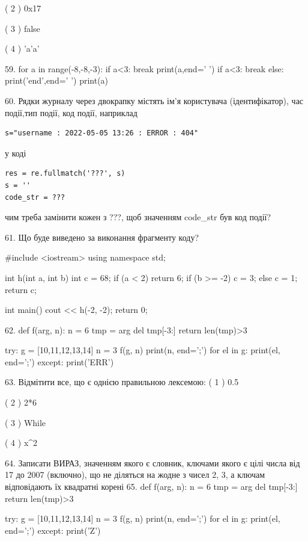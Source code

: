 \documentclass[11pt]{article}
\begin{document}
( 2 ) 0x17

( 3 ) false

( 4 ) 'a'a'

59. 
for a in range(-8,-8,-3):
    if a<3:
        break
        print(a,end=' ')
    if a<3:
        break
    else:
        print('end',end=' ')
    print(a)

60. 
Рядки журналу через двокрапку містять ім'я користувача (ідентифікатор), час події,тип події, код події, наприклад
\begin{verbatim}
s="username : 2022-05-05 13:26 : ERROR : 404"
\end{verbatim}
у коді 
\begin{verbatim}
res = re.fullmatch('???', s) 
s = ''
code_str = ??? 
\end{verbatim}
чим треба замінити кожен з ???, щоб значенням code\_str був код події? 



61. Що буде виведено за виконання фрагменту коду?

#include <iostream>
using namespace std;

int h(int a, int b){
    int c = 68;
    if (a < 2)
        return 6;
    if (b >= -2)
         c = 3;
    else 
        c = 1;
    return c;
}

int main(){
    cout << h(-2, -2);
    return 0;
}

62. 
def f(arg, n):
    n = 6
    tmp = arg
    del tmp[-3:]
    return len(tmp)>3

try:
    g = [10,11,12,13,14]
    n = 3
    f(g, n)
    print(n, end=';')
    for el in g:
        print(el, end=';')
except:
    print('ERR')

63. %
Відмітити все, що є однією правильною лексемою:
( 1 ) 0.5

( 2 ) 2*6

( 3 ) While

( 4 ) x^2

64. 
Записати ВИРАЗ, значенням якого є словник, ключами якого є цілі числа від 17 до 2007 (включно), що не діляться на жодне з чисел 2, 3, а ключам відповідають їх квадратні корені 
65. 
def f(arg, n):
    n = 6
    tmp = arg
    del tmp[-3:]
    return len(tmp)>3

try:
    g = [10,11,12,13,14]
    n = 3
    f(g, n)
    print(n, end=';')
    for el in g:
        print(el, end=';')
except:
    print('Z')
\end{document}
